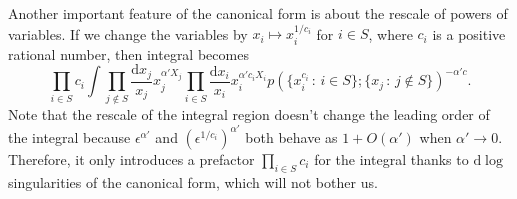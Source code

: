 \documentclass[12pt]{article}
\theoremstyle{definition}
\theoremstyle{plain}
\newcommand{\dif}{\mathrm{d}} %
\begin{document}




Another important feature of the canonical form is about the rescale of powers of variables.
If we change the variables by
\(
	x_i\mapsto x_i^{1/c_i}
\)
for $i\in S$, where $c_i$ is a positive rational number, then integral becomes
\[
	\prod_{i\in S}c_i\int
	\prod_{j\not\in S}\frac{\dif x_j}{x_j}x_j^{\alpha' X_j}
	\prod_{i\in S}\frac{\dif x_i}{x_i}x_i^{\alpha' c_iX_i}
	p(\{x_i^{c_i}\,:\, i\in S\};\{x_j\,:\, j\not\in S\})^{-\alpha' c}.
\]
Note that the rescale of the integral region doesn't change the leading order of the integral
because $\epsilon^{\alpha'}$ and $(\epsilon^{1/c_i})^{\alpha'}$ both behave as $1+O(\alpha')$
when $\alpha'\to 0$. Therefore, it only introduces a prefactor $\prod_{i\in S}c_i$ 
for the integral thanks to $\dif \log$ singularities of the canonical form, 
which will not bother us. 
\end{document}
